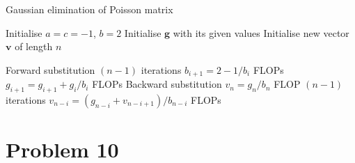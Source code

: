 \documentclass[english,notitlepage,aps,pra,10pt]{revtex4-2}
\newcommand{\bv}[1]{\mathbf{#1}}
\begin{document}
\begin{algorithm}[H]
    \caption{Gaussian elimination of Poisson matrix}\label{algo:PoissonGauss}
    \begin{algorithmic}
        \State Initialise $a = c = -1$, $b = 2$
        \State Initialise $\bv{g}$ with its given values
        \State Initialise new vector $\bv{v}$ of length $n$ 

        \Comment Forward substitution
                                \Comment $(n-1)$ iterations
            \State $b_{i+1} = 2 - 1/b_i$                     FLOPs 
            \State $g_{i+1} = g_{i+1} + g_{i}/b_{i}$         FLOPs 
        \EndFor
        \Comment Backward substitution
        \State $v_n = g_n/b_n$                               FLOP 
                                \Comment $(n-1)$ iterations
            \State $v_{n-i} = (g_{n-i} + v_{n-i+1})/b_{n-i}$   FLOPs
        \EndFor
    \end{algorithmic}
\end{algorithm}


\section*{Problem 10}
\end{document}
